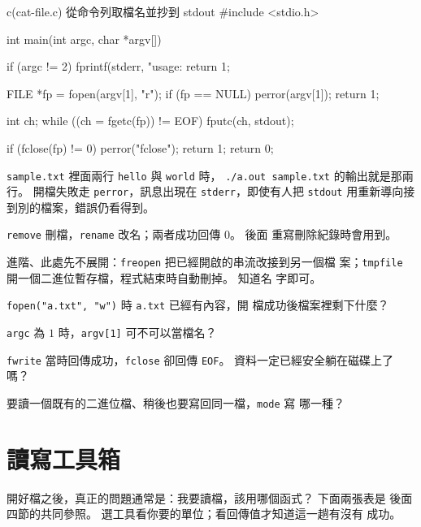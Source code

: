 \begin{example}[label=ex:fio-cat-file]{c}{(cat-f{}ile.c) 從命令列取檔名並抄到 stdout}
#include <stdio.h>

int main(int argc, char *argv[]) {
    if (argc != 2) {
        fprintf(stderr, "usage: %
        return 1;
    }

    FILE *fp = fopen(argv[1], "r");
    if (fp == NULL) {
        perror(argv[1]);
        return 1;
    }

    int ch;
    while ((ch = fgetc(fp)) != EOF) {
        fputc(ch, stdout);
    }

    if (fclose(fp) != 0) {
        perror("fclose");
        return 1;
    }
    return 0;
}
\end{example}

\texttt{sample.txt} 裡面兩行 \texttt{hello} 與 \texttt{world} 時，
\texttt{./a.out sample.txt} 的輸出就是那兩行。 開檔失敗走
\texttt{perror}，訊息出現在 \texttt{stderr}，即使有人把
\texttt{stdout} 用重新導向接到別的檔案，錯誤仍看得到。


\texttt{remove} 刪檔，\texttt{rename} 改名；兩者成功回傳 $0$。 後面
重寫刪除紀錄時會用到。

進階、此處先不展開：\texttt{freopen} 把已經開啟的串流改接到另一個檔
案；\texttt{tmpfile} 開一個二進位暫存檔，程式結束時自動刪掉。 知道名
字即可。

\begin{drills}[label=drills:fio-open]
\item \texttt{fopen("a.txt", "w")} 時 \texttt{a.txt} 已經有內容，開
檔成功後檔案裡剩下什麼？
\item \texttt{argc} 為 $1$ 時，\texttt{argv[1]} 可不可以當檔名？
\item \texttt{fwrite} 當時回傳成功，\texttt{fclose} 卻回傳
\texttt{EOF}。 資料一定已經安全躺在磁碟上了嗎？
\item 要讀一個既有的二進位檔、稍後也要寫回同一檔，\texttt{mode} 寫
哪一種？
\end{drills}

\section{讀寫工具箱}
\label{sec:fio-toolbox}

開好檔之後，真正的問題通常是：我要讀檔，該用哪個函式？ 下面兩張表是
後面四節的共同參照。 選工具看你要的單位；看回傳值才知道這一趟有沒有
成功。

